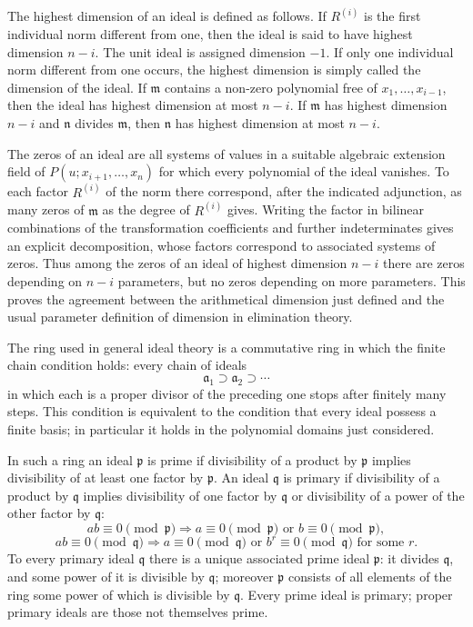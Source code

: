 \documentclass[11pt]{article}
\begin{document}
The highest dimension of an ideal is defined as follows. If $R^{(i)}$ is the first individual norm different from one, then the ideal is said to have highest dimension $n-i$. The unit ideal is assigned dimension $-1$. If only one individual norm different from one occurs, the highest dimension is simply called the dimension of the ideal. If $\mathfrak m$ contains a non-zero polynomial free of $x_1,\ldots,x_{i-1}$, then the ideal has highest dimension at most $n-i$. If $\mathfrak m$ has highest dimension $n-i$ and $\mathfrak n$ divides $\mathfrak m$, then $\mathfrak n$ has highest dimension at most $n-i$.

The zeros of an ideal are all systems of values in a suitable algebraic extension field of $P(u;x_{i+1},\ldots,x_n)$ for which every polynomial of the ideal vanishes. To each factor $R^{(i)}$ of the norm there correspond, after the indicated adjunction, as many zeros of $\mathfrak m$ as the degree of $R^{(i)}$ gives. Writing the factor in bilinear combinations of the transformation coefficients and further indeterminates gives an explicit decomposition, whose factors correspond to associated systems of zeros. Thus among the zeros of an ideal of highest dimension $n-i$ there are zeros depending on $n-i$ parameters, but no zeros depending on more parameters. This proves the agreement between the arithmetical dimension just defined and the usual parameter definition of dimension in elimination theory.

The ring used in general ideal theory is a commutative ring in which the finite chain condition holds: every chain of ideals
\[
  \mathfrak a_1\supset \mathfrak a_2\supset\cdots
\]
in which each is a proper divisor of the preceding one stops after finitely many steps. This condition is equivalent to the condition that every ideal possess a finite basis; in particular it holds in the polynomial domains just considered.

In such a ring an ideal $\mathfrak p$ is prime if divisibility of a product by $\mathfrak p$ implies divisibility of at least one factor by $\mathfrak p$. An ideal $\mathfrak q$ is primary if divisibility of a product by $\mathfrak q$ implies divisibility of one factor by $\mathfrak q$ or divisibility of a power of the other factor by $\mathfrak q$:
\[
  ab\equiv0\pmod{\mathfrak p}\Rightarrow a\equiv0\pmod{\mathfrak p}\text{ or }b\equiv0\pmod{\mathfrak p},
\]
\[
  ab\equiv0\pmod{\mathfrak q}\Rightarrow a\equiv0\pmod{\mathfrak q}\text{ or }b^r\equiv0\pmod{\mathfrak q}\text{ for some }r.
\]
To every primary ideal $\mathfrak q$ there is a unique associated prime ideal $\mathfrak p$: it divides $\mathfrak q$, and some power of it is divisible by $\mathfrak q$; moreover $\mathfrak p$ consists of all elements of the ring some power of which is divisible by $\mathfrak q$. Every prime ideal is primary; proper primary ideals are those not themselves prime.
\end{document}
